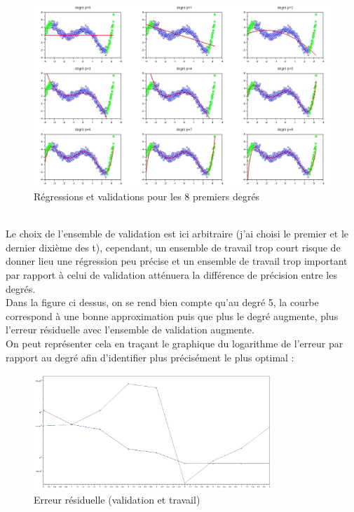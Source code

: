          \begin{figure}[h]
              \centering
                \includegraphics[width=1\textwidth]{images/reg_valid.jpg}
              \caption{Régressions et validations pour les 8 premiers degrés}
              \label{fig:reg4}
            \end{figure}
        \\
        Le choix de l'ensemble de validation est ici arbitraire (j'ai choisi le premier et le dernier dixième des t), cependant, un ensemble de travail trop court risque de donner lieu une régression peu précise et un ensemble de travail trop important par rapport à celui de validation atténuera la différence de précision entre les degrés.\\ Dans la figure ci dessus, on se rend bien compte qu'au degré 5, la courbe correspond à une bonne approximation puis que plus le degré augmente, plus l'erreur résiduelle avec l'ensemble de validation augmente.
        \\ On peut représenter cela en traçant le graphique du logarithme de l'erreur par rapport au degré afin d'identifier plus précisément le plus optimal : 
        \begin{figure}[h]
              \centering
              \captionsetup{font=small}
                \includegraphics[width=0.8\textwidth]{images/erreur.jpg}
              \caption{Erreur résiduelle (validation et travail)}
              \label{fig:reg5}
            \end{figure}

